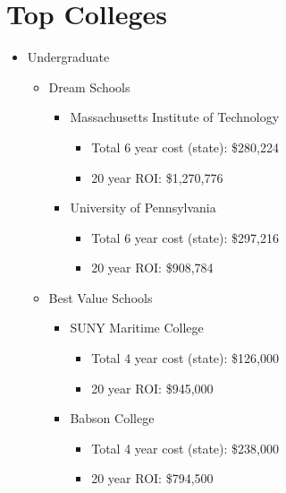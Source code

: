 \section{Top Colleges}
\begin{itemize}
    \item{Undergraduate} 
    \begin{itemize}
        \item{Dream Schools}
            \begin{itemize}
                \item{Massachusetts Institute of Technology}
                    \begin{itemize}
                        \item{Total 6 year cost (state):} \$280,224 
                        \item{20 year ROI:} \$1,270,776
                    \end{itemize}
                \item{University of Pennsylvania}
                    \begin{itemize}
                        \item{Total 6 year cost (state):} \$297,216 
                        \item{20 year ROI:} \$908,784
                    \end{itemize}
            \end{itemize}
        \item{Best Value Schools} 
            \begin{itemize}
                \item{SUNY Maritime College}
                    \begin{itemize}
                        \item{Total 4 year cost (state):} \$126,000 
                        \item{20 year ROI:} \$945,000
                    \end{itemize}
                \item{Babson College}
                    \begin{itemize}
                        \item{Total 4 year cost (state):} \$238,000
                        \item{20 year ROI:} \$794,500
                    \end{itemize}
            \end{itemize}
    \end{itemize}

\end{itemize}
